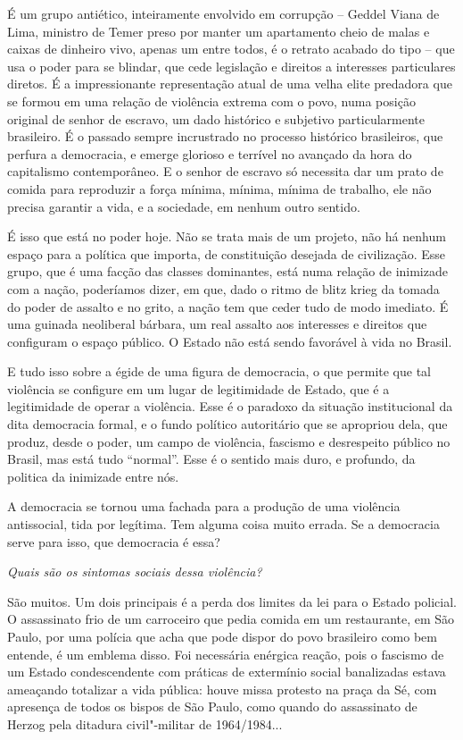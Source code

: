 É um grupo antiético, inteiramente envolvido em corrupção -- Geddel
Viana de Lima, ministro de Temer preso por manter um apartamento cheio
de malas e caixas de dinheiro vivo, apenas um entre todos, é o retrato
acabado do tipo -- que usa o poder para se blindar, que cede legislação
e direitos a interesses particulares diretos. É a impressionante
representação atual de uma velha elite predadora que se formou em uma
relação de violência extrema com o povo, numa posição original de senhor
de escravo, um dado histórico e subjetivo particularmente brasileiro. É
o passado sempre incrustrado no processo histórico brasileiros, que
perfura a democracia, e emerge glorioso e terrível no avançado da hora
do capitalismo contemporâneo. E o senhor de escravo só necessita dar um
prato de comida para reproduzir a força mínima, mínima, mínima de
trabalho, ele não precisa garantir a vida, e a sociedade, em nenhum
outro sentido.

É isso que está no poder hoje. Não se trata mais de um projeto, não há
nenhum espaço para a política que importa, de constituição desejada de
civilização. Esse grupo, que é uma facção das classes dominantes, está
numa relação de inimizade com a nação, poderíamos dizer, em que, dado o
ritmo de blitz krieg da tomada do poder de assalto e no grito, a nação
tem que ceder tudo de modo imediato. É uma guinada neoliberal bárbara,
um real assalto aos interesses e direitos que configuram o espaço
público. O Estado não está sendo favorável à vida no Brasil.

E tudo isso sobre a égide de uma figura de democracia, o que permite que
tal violência se configure em um lugar de legitimidade de Estado, que é
a legitimidade de operar a violência. Esse é o paradoxo da situação
institucional da dita democracia formal, e o fundo político autoritário
que se apropriou dela, que produz, desde o poder, um campo de violência,
fascismo e desrespeito público no Brasil, mas está tudo ``normal''. Esse
é o sentido mais duro, e profundo, da politica da inimizade entre nós.

A democracia se tornou uma fachada para a produção de uma violência
antissocial, tida por legítima. Tem alguma coisa muito errada. Se a
democracia serve para isso, que democracia é essa?

\medskip

\noindent\emph{Quais são os sintomas sociais dessa violência?}

\noindent São muitos. Um dois principais é a perda dos limites da lei para o
Estado policial. O assassinato frio de um carroceiro que pedia comida em
um restaurante, em São Paulo, por uma polícia que acha que pode dispor
do povo brasileiro como bem entende, é um emblema disso. Foi necessária
enérgica reação, pois o fascismo de um Estado condescendente com
práticas de extermínio social banalizadas estava ameaçando totalizar a
vida pública: houve missa protesto na praça da Sé, com apresença de
todos os bispos de São Paulo, como quando do assassinato de Herzog pela
ditadura civil"-militar de 1964/1984...


